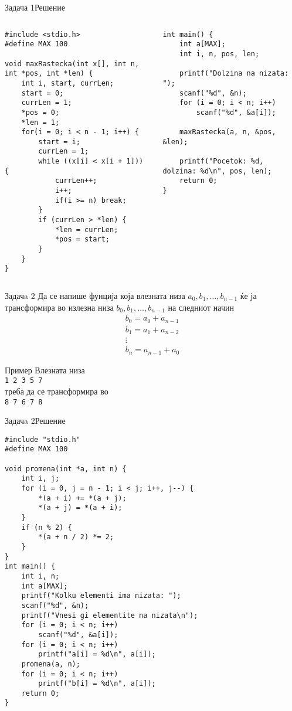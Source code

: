 \begin{frame}[fragile]{Задача 1}{Решение}
\begin{columns}
\begin{lstlisting}
#include <stdio.h>
#define MAX 100

void maxRastecka(int x[], int n, int *pos, int *len) {
    int i, start, currLen;
    start = 0;
    currLen = 1;
    *pos = 0;
    *len = 1;
    for(i = 0; i < n - 1; i++) {
        start = i;
        currLen = 1;
        while ((x[i] < x[i + 1])) {
            currLen++;
            i++;
            if(i >= n) break;
        }
        if (currLen > *len) {
            *len = currLen;
            *pos = start;
        }
    }
}
\end{lstlisting}
\begin{lstlisting}
int main() {
    int a[MAX];
    int i, n, pos, len;

    printf("Dolzina na nizata: ");
    scanf("%d", &n);
    for (i = 0; i < n; i++)
        scanf("%d", &a[i]);

    maxRastecka(a, n, &pos, &len);

    printf("Pocetok: %d, dolzina: %d\n", pos, len);
    return 0;
}
\end{lstlisting}
\end{columns}
\end{frame}

\begin{frame}{Задачa 2}
Да се напише фунција која влезната низа $a_0, b_1, \ldots, b_{n-1}$ ќе ја
трансформира во излезна низа $b_0, b_1, \ldots, b_{n-1}$ на следниот
начин
\[
\begin{array}{l}
b_0 = a_0 + a_{n-1}\\
b_1 = a_1 + a_{n-2}\\
\vdots\\
b_n = a_{n-1} + a_{0}
\end{array}
\]
\begin{exampleblock}{Пример} 
Влезната низа\\
\texttt{1 2 3 5 7}\\
треба да се трансформира во\\
\texttt{8 7 6 7 8}
\end{exampleblock}
\end{frame}

\begin{frame}[fragile]{Задачa 2}{Решение} 
\begin{lstlisting}
#include "stdio.h"
#define MAX 100

void promena(int *a, int n) {
    int i, j;
    for (i = 0, j = n - 1; i < j; i++, j--) {
        *(a + i) += *(a + j);
        *(a + j) = *(a + i);
    }
    if (n % 2) {
        *(a + n / 2) *= 2;
    }
}
int main() {
    int i, n;
    int a[MAX];
    printf("Kolku elementi ima nizata: ");
    scanf("%d", &n);
    printf("Vnesi gi elementite na nizata\n");
    for (i = 0; i < n; i++)
        scanf("%d", &a[i]);
    for (i = 0; i < n; i++)
        printf("a[i] = %d\n", a[i]);
    promena(a, n);
    for (i = 0; i < n; i++)
        printf("b[i] = %d\n", a[i]);
    return 0;
}
\end{lstlisting}
\end{frame}

